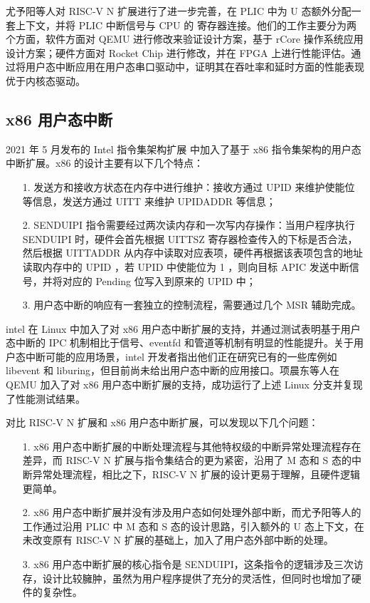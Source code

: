 尤予阳等人对 RISC-V N 扩展进行了进一步完善，在 PLIC 中为 U 态额外分配一套上下文，并将 PLIC 中断信号与 CPU 的 \FcsrUipUsip 寄存器连接。他们的工作主要分为两个方面，软件方面对 QEMU 进行修改来验证设计方案，基于 rCore 操作系统应用设计方案；硬件方面对 Rocket Chip 进行修改，并在 FPGA 上进行性能评估。通过将用户态中断应用在用户态串口驱动中，证明其在吞吐率和延时方面的性能表现优于内核态驱动。

\subsection{x86 用户态中断}

2021 年 5 月发布的 Intel 指令集架构扩展 \cite{inteluintr} 中加入了基于 x86 指令集架构的用户态中断扩展。x86 的设计主要有以下几个特点：

\begin{itemize}
    \item[1.] 发送方和接收方状态在内存中进行维护：接收方通过 UPID 来维护使能位等信息，发送方通过 UITT 来维护 UPIDADDR 等信息；
    \item[2.] SENDUIPI 指令需要经过两次读内存和一次写内存操作：当用户程序执行 SENDUIPI 时，硬件会首先根据 UITTSZ 寄存器检查传入的下标是否合法，然后根据 UITTADDR 从内存中读取对应表项，硬件再根据该表项包含的地址读取内存中的 UPID ，若 UPID 中使能位为 1 ，则向目标 APIC 发送中断信号，并将对应的 Pending 位写入到原来的 UPID 中；
    \item[3.] 用户态中断的响应有一套独立的控制流程，需要通过几个 MSR 辅助完成。
\end{itemize}

intel 在 Linux 中加入了对 x86 用户态中断扩展的支持，并通过测试表明基于用户态中断的 IPC 机制相比于信号、eventfd 和管道等机制有明显的性能提升\cite{x86uintr}。关于用户态中断可能的应用场景，intel 开发者指出他们正在研究已有的一些库例如 libevent 和 liburing，但目前尚未给出用户态中断的应用接口。项晨东等人在 QEMU 加入了对 x86 用户态中断扩展的支持，成功运行了上述 Linux 分支并复现了性能测试结果。

对比 RISC-V N 扩展和 x86 用户态中断扩展，可以发现以下几个问题：

\begin{itemize}
    \item[1.] x86 用户态中断扩展的中断处理流程与其他特权级的中断异常处理流程存在差异，而 RISC-V N 扩展与指令集结合的更为紧密，沿用了 M 态和 S 态的中断异常处理流程，相比之下，RISC-V N 扩展的设计更易于理解，且硬件逻辑更简单。
    \item[2.] x86 用户态中断扩展并没有涉及用户态如何处理外部中断，而尤予阳等人的工作通过沿用 PLIC 中 M 态和 S 态的设计思路，引入额外的 U 态上下文，在未改变原有 RISC-V N 扩展的基础上，加入了用户态外部中断的处理。
    \item[3.] x86 用户态中断扩展的核心指令是 SENDUIPI，这条指令的逻辑涉及三次访存，设计比较臃肿，虽然为用户程序提供了充分的灵活性，但同时也增加了硬件的复杂性。
\end{itemize}

